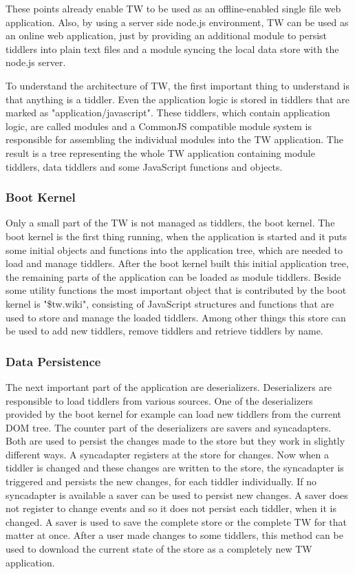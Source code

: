 \documentclass[12pt,a4paper]{scrartcl}
\newcommand{\todo}[1]{{\bf TODO: #1}\\
}
\begin{document}
These points already enable TW to be used as an offline-enabled single file web application.
Also, by using a server side node.js environment, TW can be used as an online web application, just by providing an additional module to persist tiddlers into plain text files and a module syncing the local data store with the node.js server.

To understand the architecture of TW, the first important thing to understand is that anything is a tiddler.
Even the application logic is stored in tiddlers that are marked as "application/javascript".
These tiddlers, which contain application logic, are called modules and a CommonJS compatible module system is responsible for assembling the individual modules into the TW application.
The result is a tree representing the whole TW application containing module tiddlers, data tiddlers and some JavaScript functions and objects.

\subsubsection*{Boot Kernel}
Only a small part of the TW is not managed as tiddlers, the boot kernel.
The boot kernel is the first thing running, when the application is started and it puts some initial objects and functions into the application tree, which are needed to load and manage tiddlers.
After the boot kernel built this initial application tree, the remaining parts of the application can be loaded as module tiddlers.
Beside some utility functions the most important object that is contributed by the boot kernel is "\$tw.wiki", consisting of JavaScript structures and functions that are used to store and manage the loaded tiddlers.
Among other things this store can be used to add new tiddlers, remove tiddlers and retrieve tiddlers by name.

\subsubsection*{Data Persistence}
The next important part of the application are deserializers. Deserializers are responsible to load tiddlers from various sources. One of the deserializers provided by the boot kernel for example can load new tiddlers from the current DOM tree.
The counter part of the deserializers are savers and syncadapters.
Both are used to persist the changes made to the store but they work in slightly different ways.
A syncadapter registers at the store for changes.
Now when a tiddler is changed and these changes are written to the store, the syncadapter is triggered and persists the new changes, for each tiddler individually.
If no syncadapter is available a saver can be used to persist new changes.
A saver does not register to change events and so it does not persist each tiddler, when it is changed.
A saver is used to save the complete store or the complete TW for that matter at once. After a user made changes to some tiddlers, this method can be used to download the current state of the store as a completely new TW application.
\end{document}

